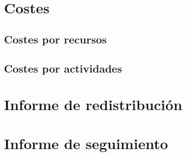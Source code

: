 \documentclass[11pt,a4paper,spanish,twoside]{report}
\begin{document}
\section{Costes}
\subsection{Costes por recursos}
\subsection{Costes por actividades}

\section{Informe de redistribución}

\section{Informe de seguimiento}


 

\end{document}
